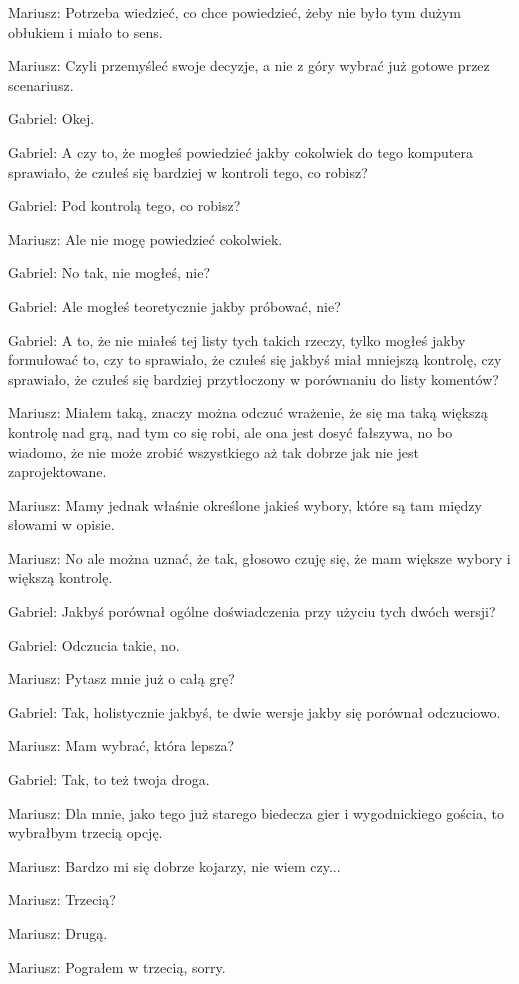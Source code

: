 Mariusz: Potrzeba wiedzieć, co chce powiedzieć, żeby nie było tym dużym obłukiem i miało to sens.

Mariusz: Czyli przemyśleć swoje decyzje, a nie z góry wybrać już gotowe przez scenariusz.

Gabriel: Okej.

Gabriel: A czy to, że mogłeś powiedzieć jakby cokolwiek do tego komputera sprawiało, że czułeś się bardziej w kontroli tego, co robisz?

Gabriel: Pod kontrolą tego, co robisz?

Mariusz: Ale nie mogę powiedzieć cokolwiek.

Gabriel: No tak, nie mogłeś, nie?

Gabriel: Ale mogłeś teoretycznie jakby próbować, nie?

Gabriel: A to, że nie miałeś tej listy tych takich rzeczy, tylko mogłeś jakby formułować to, czy to sprawiało, że czułeś się jakbyś miał mniejszą kontrolę, czy sprawiało, że czułeś się bardziej przytłoczony w porównaniu do listy komentów?

Mariusz: Miałem taką, znaczy można odczuć wrażenie, że się ma taką większą kontrolę nad grą, nad tym co się robi, ale ona jest dosyć fałszywa, no bo wiadomo, że nie może zrobić wszystkiego aż tak dobrze jak nie jest zaprojektowane.

Mariusz: Mamy jednak właśnie określone jakieś wybory, które są tam między słowami w opisie.

Mariusz: No ale można uznać, że tak, głosowo czuję się, że mam większe wybory i większą kontrolę.

Gabriel: Jakbyś porównał ogólne doświadczenia przy użyciu tych dwóch wersji?

Gabriel: Odczucia takie, no.

Mariusz: Pytasz mnie już o całą grę?

Gabriel: Tak, holistycznie jakbyś, te dwie wersje jakby się porównał odczuciowo.

Mariusz: Mam wybrać, która lepsza?

Gabriel: Tak, to też twoja droga.

Mariusz: Dla mnie, jako tego już starego biedecza gier i wygodnickiego gościa, to wybrałbym trzecią opcję.

Mariusz: Bardzo mi się dobrze kojarzy, nie wiem czy...

Mariusz: Trzecią?

Mariusz: Drugą.

Mariusz: Pograłem w trzecią, sorry.

